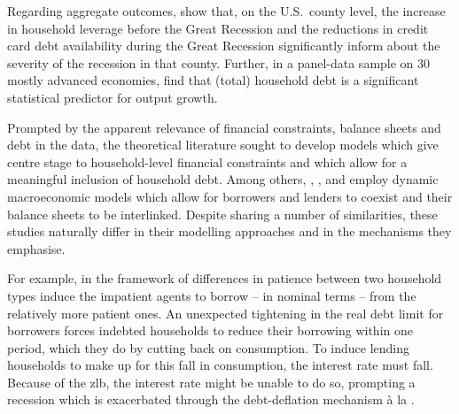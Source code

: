 \documentclass[12pt]{article} %
\numberwithin{equation}{section} %
\begin{document}
Regarding aggregate outcomes, \textcite{mian2010} show that, on the U.S.~county level, the increase in household leverage before the Great Recession and the reductions in credit card debt availability during the Great Recession significantly inform about the severity of the recession in that county. Further, in a panel-data sample on 30 mostly advanced economies, \textcite{mian2017} find that (total) household debt is a significant statistical predictor for output growth.


Prompted by the apparent relevance of financial constraints, balance sheets and debt in the data, the theoretical literature sought to develop models which give centre stage to household-level financial constraints and which allow for a meaningful inclusion of household debt. Among others, \textcite{egg2012}, \textcite{riosrull2015}, \textcite{justiniano2015} and \textcite{gl2017} employ dynamic macroeconomic models which allow for borrowers and lenders to coexist and their balance sheets to be interlinked. Despite sharing a number of similarities, these studies naturally differ in their modelling approaches and in the mechanisms they emphasise.

For example, in the framework of \textcite{egg2012} differences in patience between two household types induce the impatient agents to borrow -- in nominal terms -- from the relatively more patient ones. An unexpected tightening in the real debt limit for borrowers forces indebted households to reduce their borrowing within one period, which they do by cutting back on consumption. To induce lending households to make up for this fall in consumption, the interest rate must fall. Because of the \Gls{zlb}, the interest rate might be unable to do so, prompting a recession which is exacerbated through the debt-deflation mechanism à la \textcite{fisher1933}.

\end{document}
